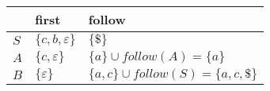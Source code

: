 \documentclass{standalone}
\providecommand\lightrule{%
	\arrayrulecolor{black!30}%
	\midrule[\lightrulewidth]%
	\arrayrulecolor{black}}
\begin{document}
\begin{tabularx}{\textwidth}{XXX}
        & first & follow \\
        \midrule
            \(S\)
            &
            \(\{c, b, \varepsilon\}\)
            &
            \(\{\$\}\)
            \\ \lightrule
            \(A\)
            &
            \(\{c, \varepsilon\}\)
            &
            \(\{a\} \cup follow(A) = \{a\}\)
            \\ \lightrule
            \(B\)
            &
            \(\{\varepsilon\}\)
            &
            \(\{a, c\} \cup follow(S) = \{a, c, \$\}\)
    \end{tabularx}
\end{document}
